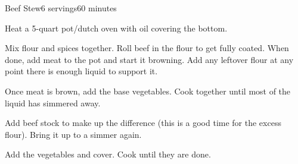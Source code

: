 \documentclass[../Cookbook.tex]{subfiles}
\begin{document}
\begin{recipe}{Beef Stew}{6 servings}{60 minutes}

Heat a 5-quart pot/dutch oven with oil covering the bottom.

Mix flour and spices together. Roll beef in the flour to get fully coated. When done, add meat to the pot and start it browning. Add any leftover flour at any point there is enough liquid to support it.

Once meat is brown, add the base vegetables. Cook together until most of the liquid has simmered away.

Add beef stock to make up the difference (this is a good time for the excess flour). Bring it up to a simmer again.

Add the vegetables and cover. Cook until they are done.

\end{recipe}
\end{document}
